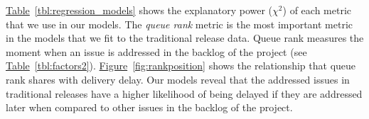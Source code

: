\begin{sloppypar}
\noindent{}
\hyperref[tbl:regression_models]{Table}~\ref{tbl:regression_models} shows the
explanatory power ($\chi^2$) of each metric that we use in our models.  The
\textit{queue rank} metric is the most important metric in the models that we
fit to the traditional release data.  Queue rank measures the moment when an
issue is addressed in the backlog of the project (see
\hyperref[tbl:factors2]{Table}~\ref{tbl:factors2}).
\hyperref[fig:rankposition]{Figure}~\ref{fig:rankposition} shows the
relationship that queue rank shares with delivery delay. Our models reveal that
the addressed issues in traditional releases have a higher likelihood of being
delayed if they are addressed later when compared to other issues in the backlog
of the project.   

\begin{figure}[t]
	\centering


\end{figure}
\end{sloppypar}
